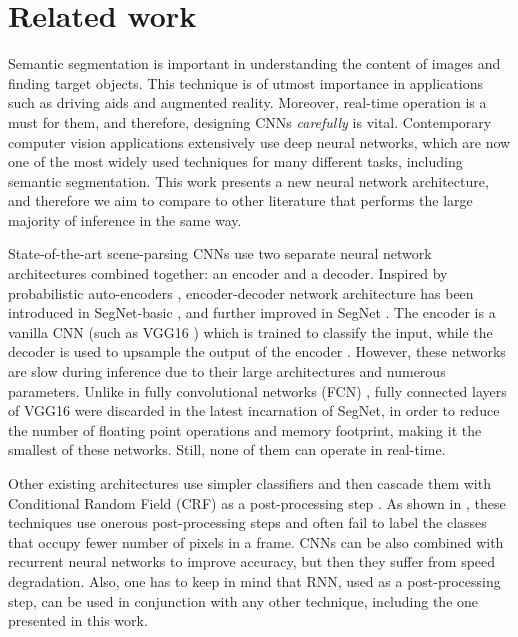 \documentclass{article}
\begin{document}
\section{Related work}

Semantic segmentation is important in understanding the content of images and finding target objects.
This technique is of utmost importance in applications such as driving aids and augmented reality.
Moreover, real-time operation is a must for them, and therefore, designing CNNs \textit{carefully} is vital.
Contemporary computer vision applications extensively use deep neural networks, which are now one of the most widely used techniques for many different tasks, including semantic segmentation.
This work presents a new neural network architecture, and therefore we aim to compare to other literature that performs the large majority of inference in the same way.

State-of-the-art scene-parsing CNNs use two separate neural network architectures combined together: an encoder and a decoder.
Inspired by probabilistic auto-encoders \cite{ranzato07,ngiam11}, encoder-decoder network architecture has been introduced in SegNet-basic \cite{badrinarayanan15basic}, and further improved in SegNet \cite{badrinarayanan15}.
The encoder is a vanilla CNN (such as VGG16 \cite{simonyan14}) which is trained to classify the input, while the decoder is used to upsample the output of the encoder \cite{long15,noh2015learning,zheng2015conditional,eigen2015predicting,hong2015decoupled}.
However, these networks are slow during inference due to their large architectures and numerous parameters.
Unlike in fully convolutional networks (FCN) \cite{long15}, fully connected layers of VGG16 were discarded in the latest incarnation of SegNet, in order to reduce the number of floating point operations and memory footprint, making it the smallest of these networks.
Still, none of them can operate in real-time.

Other existing architectures use simpler classifiers and then cascade them with Conditional Random Field (CRF) as a post-processing step \cite{liang14,sturgess09}.
As shown in \cite{badrinarayanan15}, these techniques use onerous post-processing steps and often fail to label the classes that occupy fewer number of pixels in a frame.
CNNs can be also combined with recurrent neural networks \cite{zheng2015conditional} to improve accuracy, but then they suffer from speed degradation.
Also, one has to keep in mind that RNN, used as a post-processing step, can be used in conjunction with any other technique, including the one presented in this work.
\end{document}
